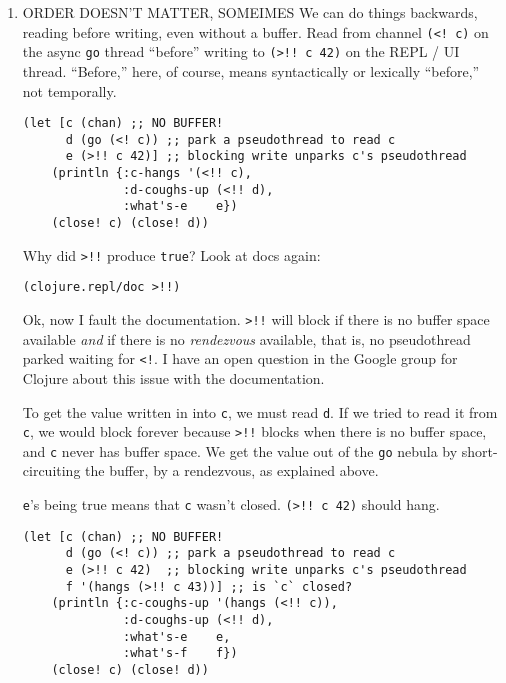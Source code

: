 \documentclass[10pt,oneside,x11names]{article}
\begin{document}
\begin{enumerate}
\item ORDER DOESN'T MATTER, SOMEIMES
\label{order-doesnt-matter-someimes}
We can do things backwards, reading before writing, even without a
buffer. Read from channel \texttt{(<! c)} on the async \texttt{go} thread ``before''
writing to \texttt{(>!! c 42)} on the REPL / UI thread. ``Before,'' here, of
course, means syntactically or lexically ``before,'' not temporally.

\begin{verbatim}
(let [c (chan) ;; NO BUFFER!
      d (go (<! c)) ;; park a pseudothread to read c
      e (>!! c 42)] ;; blocking write unparks c's pseudothread
    (println {:c-hangs '(<!! c),
              :d-coughs-up (<!! d),
              :what's-e    e})
    (close! c) (close! d))
\end{verbatim}

Why did \texttt{>!!} produce \texttt{true}? Look at docs again:

\begin{verbatim}
(clojure.repl/doc >!!)
\end{verbatim}

Ok, now I fault the documentation. \texttt{>!!} will block if there is no
buffer space available \emph{and} if there is no \emph{rendezvous} available, that
is, no pseudothread parked waiting for \texttt{<!}. I have an open question in
the Google group for Clojure about this issue with the documentation.

To get the value written in into \texttt{c}, we must read \texttt{d}. If we tried to
read it from \texttt{c}, we would block forever because \texttt{>!!} blocks when there
is no buffer space, and \texttt{c} never has buffer space. We get the value out
of the \texttt{go} nebula by short-circuiting the buffer, by a rendezvous, as
explained above.

\texttt{e}'s being true means that \texttt{c} wasn't closed. \texttt{(>!! c 42)} should hang.

\begin{verbatim}
(let [c (chan) ;; NO BUFFER!
      d (go (<! c)) ;; park a pseudothread to read c
      e (>!! c 42)  ;; blocking write unparks c's pseudothread
      f '(hangs (>!! c 43))] ;; is `c` closed?
    (println {:c-coughs-up '(hangs (<!! c)),
              :d-coughs-up (<!! d),
              :what's-e    e,
              :what's-f    f})
    (close! c) (close! d))
\end{verbatim}


\end{enumerate}
\end{document}
